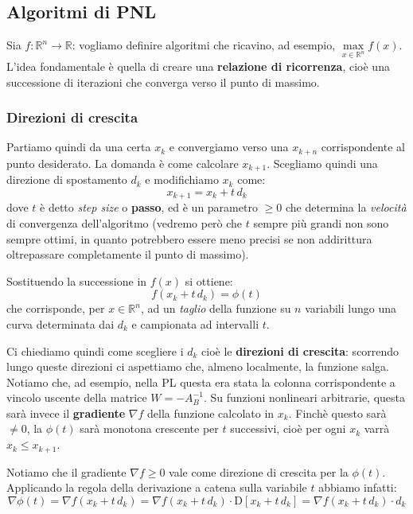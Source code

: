 \documentclass[a4paper,11pt]{article}
\begin{document}
\subsection{Algoritmi di PNL}
Sia $f: \mathbb{R}^n \rightarrow \mathbb{R}$: vogliamo definire algoritmi che ricavino, ad esempio, $\max\limits_{x \in \mathbb{R}^n} f(x)$.
L'idea fondamentale è quella di creare una \textbf{relazione di ricorrenza}, cioè una successione di iterazioni che converga verso il punto di massimo.

\subsubsection{Direzioni di crescita}
Partiamo quindi da una certa $x_k$ e convergiamo verso una $x_{k+n}$ corrispondente al punto desiderato.
La domanda è come calcolare $x_{k+1}$.
Scegliamo quindi una direzione di spostamento $d_k$ e modifichiamo $x_k$ come:
$$
x_{k + 1} = x_k + t \, d_k 
$$
dove $t$ è detto \textit{step size} o \textbf{passo}, ed è un parametro $\geq 0$ che determina la \textit{velocità} di convergenza dell'algoritmo (vedremo però che $t$ sempre più grandi non sono sempre ottimi, in quanto potrebbero essere meno precisi se non addirittura oltrepassare completamente il punto di massimo).

Sostituendo la successione in $f(x)$ si ottiene:
$$
f(x_k + t \, d_k) = \phi(t)
$$
che corrisponde, per $x \in \mathbb{R}^n$, ad un \textit{taglio} della funzione su $n$ variabili lungo una curva determinata dai $d_k$ e campionata ad intervalli $t$.

Ci chiediamo quindi come scegliere i $d_k$ cioè le \textbf{direzioni di crescita}: scorrendo lungo queste direzioni ci aspettiamo che, almeno localmente, la funzione salga.
Notiamo che, ad esempio, nella PL questa era stata la colonna corrispondente a vincolo uscente della matrice $W = -A_B^{-1}$. 
Su funzioni nonlineari arbitrarie, questa sarà invece il \textbf{gradiente} $\nabla f$ della funzione calcolato in $x_k$.
Finchè questo sarà $\neq 0$, la $\phi(t)$ sarà monotona crescente per $t$ successivi, cioè per ogni $x_k$ varrà $x_k \leq x_{k+1}$.

Notiamo che il gradiente $\nabla f \geq 0$ vale come direzione di crescita per la $\phi(t)$.
Applicando la regola della derivazione a catena sulla variabile $t$ abbiamo infatti:
$$
\nabla \phi(t) = \nabla f(x_k + t \, d_k) = \nabla f(x_k + t \, d_k) \cdot \mathrm{D} \left[x_k + t \, d_k\right] = \nabla f(x_k + t \, d_k) \cdot  d_k
$$
\end{document}
